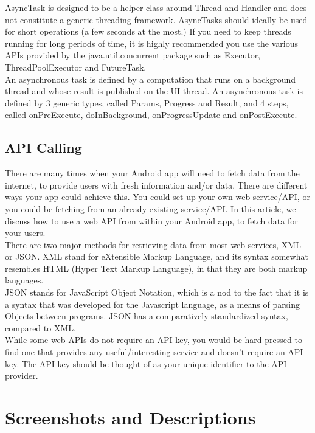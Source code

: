 \documentclass[twoside,a4paper,16pt]{book}
\begin{document}
\begin{itemize}
\begin{enumerate}
\begin{enumerate}
AsyncTask is designed to be a helper class around Thread and Handler and does not constitute a generic threading framework. AsyncTasks should ideally be used for short operations (a few seconds at the most.) If you need to keep threads running for long periods of time, it is highly recommended you use the various APIs provided by the java.util.concurrent package such as Executor, ThreadPoolExecutor and FutureTask.\\

An asynchronous task is defined by a computation that runs on a background thread and whose result is published on the UI thread. An asynchronous task is defined by 3 generic types, called Params, Progress and Result, and 4 steps, called onPreExecute, doInBackground, onProgressUpdate and onPostExecute.\\




\section{API Calling}
There are many times when your Android app will need to fetch data from the internet, to provide users with fresh information and/or data. There are different ways your app could achieve this. You could set up your own web service/API, or you could be fetching from an already existing service/API. In this article, we discuss how to use a web API from within your Android app, to fetch data for your users.\\

There are two major methods for retrieving data from most web services, XML or JSON. XML stand for eXtensible Markup Language, and its syntax somewhat resembles HTML (Hyper Text Markup Language), in that they are both markup languages.\\

JSON stands for JavaScript Object Notation, which is a nod to the fact that it is a syntax that was developed for the Javascript language, as a means of parsing Objects between programs. JSON has a comparatively standardized syntax, compared to XML.\\

While some web APIs do not require an API key, you would be hard pressed to find one that provides any useful/interesting service and doesn’t require an API key. The API key should be thought of as your unique identifier to the API provider.




\chapter{Screenshots and Descriptions}

\end{enumerate}
\end{enumerate}
\end{itemize}
\end{document}
